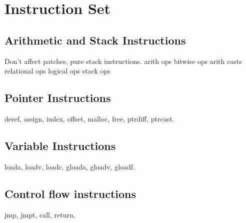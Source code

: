 \chapter{Instruction Set}
\section{Arithmetic and Stack Instructions}
Don't affect patches, pure stack instructions.
arith ops %
bitwise ops %
arith casts %
relational ops %
logical ops %
stack ops %
\section{Pointer Instructions}
deref, assign, index, offset, malloc, free, ptrdiff, ptrcast.
\section{Variable Instructions}
loada, loadv, loadc.
gloada, gloadv, gloadf.
\section{Control flow instructions}
jmp, jmpt, call, return.